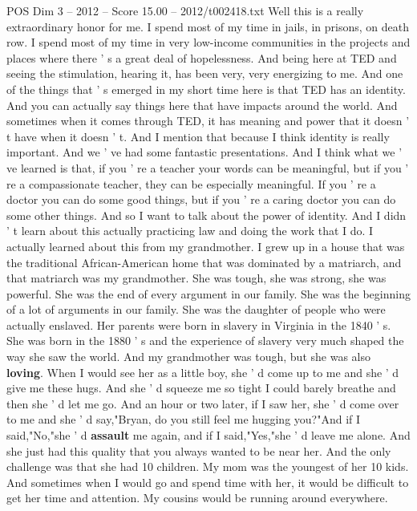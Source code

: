 \begin{textsample}{POS Dim 3 – 2012 – Score 15.00 – 2012/t002418.txt}  \label{ex:f3_pos_044}
Well this is a really extraordinary honor for me.
I spend most of my time in jails, in prisons, on death row.
I spend most of my time in very low-income communities in the projects and places where there ' s a great deal of hopelessness.
And being here at TED and seeing the stimulation, hearing it, has been very, very energizing to me.
And one of the things that ' s emerged in my short time here is that TED has an identity.
And you can actually say things here that have impacts around the world.
And sometimes when it comes through TED, it has meaning and power that it doesn ' t have when it doesn ' t.
And I mention that because I think identity is really important.
And we ' ve had some fantastic presentations.
And I think what we ' ve learned is that, if you ' re a teacher your words can be meaningful, but if you ' re a compassionate teacher, they can be especially meaningful.
If you ' re a doctor you can do some good things, but if you ' re a caring doctor you can do some other things.
And so I want to talk about the power of identity.
And I didn ' t learn about this actually practicing law and doing the work that I do.
I actually learned about this from my grandmother.
I grew up in a house that was the traditional African-American home that was dominated by a matriarch, and that matriarch was my grandmother.
She was tough, she was strong, she was powerful.
She was the end of every argument in our family.
She was the beginning of a lot of arguments in our family.
She was the daughter of people who were actually enslaved.
Her parents were born in slavery in Virginia in the 1840 ' s.
She was born in the 1880 ' s and the experience of slavery very much shaped the way she saw the world.
And my grandmother was tough, but she was also \textbf{loving}.
When I would see her as a little boy, she ' d come up to me and she ' d give me these hugs.
And she ' d squeeze me so tight I could barely breathe and then she ' d let me go.
And an hour or two later, if I saw her, she ' d come over to me and she ' d say,"Bryan, do you still feel me hugging you?"And if I said,"No,"she ' d \textbf{assault} me again, and if I said,"Yes,"she ' d leave me alone.
And she just had this quality that you always wanted to be near her.
And the only challenge was that she had 10 children.
My mom was the youngest of her 10 kids.
And sometimes when I would go and spend time with her, it would be difficult to get her time and attention.
My cousins would be running around everywhere.

\end{textsample}
